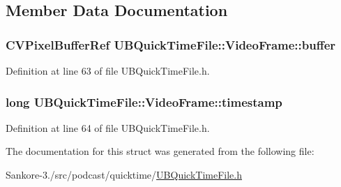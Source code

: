 \subsection{Member Data Documentation}
\hypertarget{struct_u_b_quick_time_file_1_1_video_frame_a9c80f2c63f511cf9162e762ca49a4115}{
\subsubsection[{buffer}]{\setlength{\rightskip}{0pt plus 5cm}C\-V\-Pixel\-Buffer\-Ref U\-B\-Quick\-Time\-File\-::\-Video\-Frame\-::buffer}}\label{da/df6/struct_u_b_quick_time_file_1_1_video_frame_a9c80f2c63f511cf9162e762ca49a4115}


Definition at line 63 of file U\-B\-Quick\-Time\-File.\-h.

\hypertarget{struct_u_b_quick_time_file_1_1_video_frame_a91f04be8fde673cfe5922bb90784eae2}{
\subsubsection[{timestamp}]{\setlength{\rightskip}{0pt plus 5cm}long U\-B\-Quick\-Time\-File\-::\-Video\-Frame\-::timestamp}}\label{da/df6/struct_u_b_quick_time_file_1_1_video_frame_a91f04be8fde673cfe5922bb90784eae2}


Definition at line 64 of file U\-B\-Quick\-Time\-File.\-h.



The documentation for this struct was generated from the following file\-:\begin{DoxyCompactItemize}
\item 
Sankore-\/3./src/podcast/quicktime/\hyperlink{_u_b_quick_time_file_8h}{U\-B\-Quick\-Time\-File.\-h}\end{DoxyCompactItemize}
